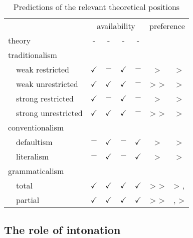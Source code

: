 \documentclass[fleqn,reqno,10pt,draft]{article}
\newcommand{\lit}{\acro{lit}}
\newcommand{\glb}{\acro{glb}}
\newcommand{\loc}{\acro{loc}}
\newcommand{\as}{\acro{as}}
\renewcommand{\es}{\acro{es}}
\begin{document}
\begin{table}[t]
  \centering
  \begin{tabular}{lcccccc}
    & \multicolumn{4}{c}{availability} 
    & \multicolumn{2}{c}{preference}
    \\ \cmidrule(r){2-5}  \cmidrule(r){6-7}
    theory
    & \as-\glb
    & \as-\loc
    & \es-\glb
    & \es-\loc
    & \as
    & \es
    \\ \midrule
    traditionalism
    \\
    \ \ weak restricted 
    & $\checkmark$
    & $-$
    & $\checkmark$
    & $-$
    & \lit > \glb 
    & \lit > \glb
    \\
    \ \ weak unrestricted
    & $\checkmark$
    & $\checkmark$
    & $\checkmark$
    & $-$
    & \lit > \glb > \loc 
    & \lit > \glb
    \\
    \ \ strong restricted
    & $\checkmark$
    & $-$
    & $\checkmark$
    & $-$
    & \glb > \lit 
    & \glb > \lit
    \\
    \ \ strong unrestricted
    & $\checkmark$
    & $\checkmark$
    & $\checkmark$
    & $-$
    & \glb > \loc > \lit 
    & \glb > \lit
    \\
    conventionalism
    \\
    \ \ defaultism
    & $-$
    & $\checkmark$
    & $-$
    & $\checkmark$
    & \loc >  \lit 
    & \loc >  \lit
    \\
    \ \ literalism
    & $-$
    & $\checkmark$
    & $-$
    & $\checkmark$
    & \lit >  \loc 
    & \lit >  \loc
    \\
    grammaticalism
    \\
    \ \ total
    & $\checkmark$
    & $\checkmark$
    & $\checkmark$
    & $\checkmark$
    & \loc > \glb > \lit 
    & \glb > \lit, \loc
    \\
    \ \ partial
    & $\checkmark$
    & $\checkmark$
    & $\checkmark$
    & $\checkmark$
    & \loc > \glb > \lit 
    & \glb, \loc >  \lit
    \\
  \end{tabular}
  \caption{Predictions of the relevant theoretical positions}
  \label{tab:predictions}
\end{table}



\subsection{The role of intonation}
\label{sec:role-intonation}
\end{document}
